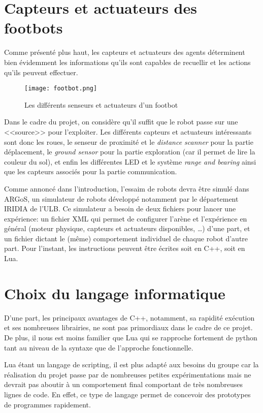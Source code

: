 \section{Capteurs et actuateurs des footbots}

Comme présenté plus haut, les capteurs et actuateurs des agents déterminent bien évidemment les informations qu'ils sont capables de recuellir et les actions qu'ils peuvent effectuer.

\begin{figure}[htb]
   \texttt{[image: footbot.png]}
      \caption{Les différents senseurs et actuateurs d'un footbot~\cite{argosSite1}}
\end{figure}

Dans le cadre du projet, on considère qu'il suffit que le robot passe sur une <<source>> pour l'exploiter. Les différents capteurs et actuateurs intéressants sont donc les roues, le senseur de proximité et le \emph{distance scanner} pour la partie déplacement, le \emph{ground sensor} pour la partie exploration (car il permet de lire la couleur du sol), et enfin les différentes LED et le système \emph{range and bearing} ainsi que les capteurs associés pour la partie communication.

Comme annoncé dans l'introduction, l'essaim de robots devra être simulé dans ARGoS, un simulateur de robots développé notamment par le département IRIDIA de l'ULB. Ce simulateur a besoin de deux fichiers pour lancer une expérience: un fichier XML qui permet de configurer l'arène et l'expérience en général (moteur physique, capteurs et actuateurs disponibles, \ldots) d'une part, et un fichier dictant le (même) comportement individuel de chaque robot d'autre part. Pour l'instant, les instructions peuvent être écrites soit en C++, soit en Lua.


\section{Choix du langage informatique}

D'une part, les principaux avantages de C++, notamment, sa rapidité exécution et ses nombreuses librairies, ne sont pas primordiaux dans le cadre de ce projet. De plus, il nous est moins familier que Lua qui se rapproche fortement de python tant au niveau de la syntaxe que de l'approche fonctionnelle.

Lua étant un langage de scripting, il est plus adapté aux besoins du groupe car la réalisation du projet passe par de nombreuses petites expérimentations mais ne devrait pas aboutir à un comportement final comportant de très nombreuses lignes de code. En effet, ce type de langage permet de concevoir des prototypes de programmes rapidement.

